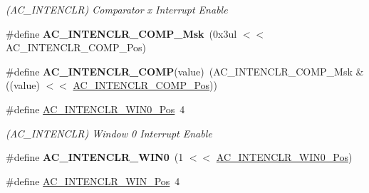 \begin{DoxyCompactItemize}
\begin{DoxyCompactList}\small\item\em (A\+C\+\_\+\+I\+N\+T\+E\+N\+C\+L\+R) Comparator x Interrupt Enable \end{DoxyCompactList}\item 
\hypertarget{group___s_a_m_l21___a_c_gac09eb38f343d78f35b102abc6f4ccc4a}{}\#define {\bfseries A\+C\+\_\+\+I\+N\+T\+E\+N\+C\+L\+R\+\_\+\+C\+O\+M\+P\+\_\+\+Msk}~(0x3ul $<$$<$ A\+C\+\_\+\+I\+N\+T\+E\+N\+C\+L\+R\+\_\+\+C\+O\+M\+P\+\_\+\+Pos)\label{group___s_a_m_l21___a_c_gac09eb38f343d78f35b102abc6f4ccc4a}

\item 
\hypertarget{group___s_a_m_l21___a_c_ga1ef2215e29f00bfc12375e93c4d6e9fb}{}\#define {\bfseries A\+C\+\_\+\+I\+N\+T\+E\+N\+C\+L\+R\+\_\+\+C\+O\+M\+P}(value)~(A\+C\+\_\+\+I\+N\+T\+E\+N\+C\+L\+R\+\_\+\+C\+O\+M\+P\+\_\+\+Msk \& ((value) $<$$<$ \hyperlink{group___s_a_m_l21___a_c_ga444b400feaaa1e25e0626635cfdf1144}{A\+C\+\_\+\+I\+N\+T\+E\+N\+C\+L\+R\+\_\+\+C\+O\+M\+P\+\_\+\+Pos}))\label{group___s_a_m_l21___a_c_ga1ef2215e29f00bfc12375e93c4d6e9fb}

\item 
\hypertarget{group___s_a_m_l21___a_c_ga8743138d490de623c23681827c5f9ed7}{}\#define \hyperlink{group___s_a_m_l21___a_c_ga8743138d490de623c23681827c5f9ed7}{A\+C\+\_\+\+I\+N\+T\+E\+N\+C\+L\+R\+\_\+\+W\+I\+N0\+\_\+\+Pos}~4\label{group___s_a_m_l21___a_c_ga8743138d490de623c23681827c5f9ed7}

\begin{DoxyCompactList}\small\item\em (A\+C\+\_\+\+I\+N\+T\+E\+N\+C\+L\+R) Window 0 Interrupt Enable \end{DoxyCompactList}\item 
\hypertarget{group___s_a_m_l21___a_c_gab32e8e68c2e625ac96bde6a8f6d42f35}{}\#define {\bfseries A\+C\+\_\+\+I\+N\+T\+E\+N\+C\+L\+R\+\_\+\+W\+I\+N0}~(1 $<$$<$ \hyperlink{group___s_a_m_l21___a_c_ga8743138d490de623c23681827c5f9ed7}{A\+C\+\_\+\+I\+N\+T\+E\+N\+C\+L\+R\+\_\+\+W\+I\+N0\+\_\+\+Pos})\label{group___s_a_m_l21___a_c_gab32e8e68c2e625ac96bde6a8f6d42f35}

\item 
\hypertarget{group___s_a_m_l21___a_c_ga0db0a40e376eff9df159115da9de0920}{}\#define \hyperlink{group___s_a_m_l21___a_c_ga0db0a40e376eff9df159115da9de0920}{A\+C\+\_\+\+I\+N\+T\+E\+N\+C\+L\+R\+\_\+\+W\+I\+N\+\_\+\+Pos}~4\label{group___s_a_m_l21___a_c_ga0db0a40e376eff9df159115da9de0920}


\end{DoxyCompactItemize}
